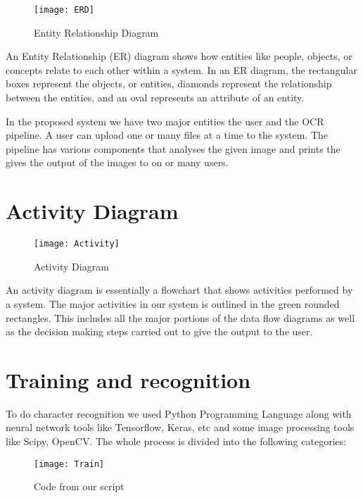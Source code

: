 \begin{figure}[htb]
\centering
\texttt{[image: ERD]}
\caption{Entity Relationship Diagram}
\end{figure}


An Entity Relationship (ER) diagram shows how entities like people, objects, or concepts relate to each other within a system. In an ER diagram, the rectangular boxes represent the objects, or entities, diamonds represent the relationship between the entities, and an oval represents an attribute of an entity.

In the proposed system we have two major entities the user and the OCR pipeline. A user can upload one or many files at a time to the system. The pipeline has various components that analyses the given image and prints the gives the output of the images to on or many users. 

\section{Activity Diagram}

\begin{figure}[htb]
\centering
\texttt{[image: Activity]}
\caption{Activity Diagram}
\end{figure}

An activity diagram is essentially a flowchart that shows activities performed by a system. 
The major activities in our system is outlined in the green rounded rectangles. This includes all the major portions of the data flow diagrams as well as the decision making steps carried out to give the output to the user.

\section{Training and recognition}
To do character recognition we used Python Programming Language along with neural network tools like Tensorflow, Keras, etc and some image processing tools like Scipy, OpenCV. The whole process is divided into the following categories:

\begin{figure}[htb]
\centering
\texttt{[image: Train]}
\caption{Code from our script}
\end{figure}

